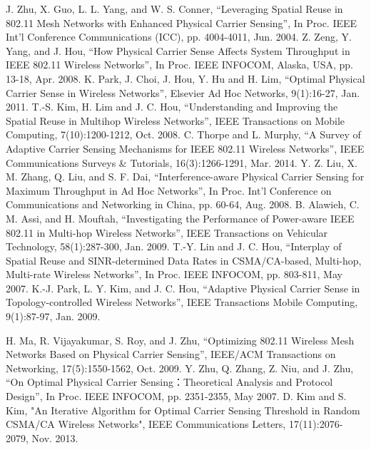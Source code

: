 \documentclass[12pt,a4paper]{article}
\begin{document}
\begin{thebibliography}{00}
 J. Zhu, X. Guo, L. L. Yang, and W. S. Conner, “Leveraging Spatial Reuse in 802.11 Mesh Networks with Enhanced Physical Carrier Sensing”, In Proc. IEEE Int’l Conference Communications (ICC), pp. 4004-4011, Jun. 2004.
 Z. Zeng, Y. Yang, and J. Hou, “How Physical Carrier Sense Affects System Throughput in IEEE 802.11 Wireless Networks”, In Proc. IEEE INFOCOM, Alaska, USA, pp. 13-18, Apr. 2008.
 K. Park, J. Choi, J. Hou, Y. Hu and H. Lim, “Optimal Physical Carrier Sense in Wireless Networks”, Elsevier Ad Hoc Networks, 9(1):16-27, Jan. 2011.
 T.-S. Kim, H. Lim and J. C. Hou, “Understanding and Improving the Spatial Reuse in Multihop Wireless Networks”, IEEE Transactions on Mobile Computing, 7(10):1200-1212, Oct. 2008.
 C. Thorpe and L. Murphy, “A Survey of Adaptive Carrier Sensing Mechanisms for IEEE 802.11 Wireless Networks”, IEEE Communications Surveys \& Tutorials, 16(3):1266-1291, Mar. 2014.
 Y. Z. Liu, X. M. Zhang, Q. Liu, and S. F. Dai, “Interference-aware Physical Carrier Sensing for Maximum Throughput in Ad Hoc Networks”, In Proc. Int’l Conference on Communications and Networking in China, pp. 60-64, Aug. 2008.
 B. Alawieh, C. M. Assi, and H. Mouftah, “Investigating the Performance of Power-aware IEEE 802.11 in Multi-hop Wireless Networks”, IEEE Transactions on Vehicular Technology, 58(1):287-300, Jan. 2009.
 T.-Y. Lin and J. C. Hou, “Interplay of Spatial Reuse and SINR-determined Data Rates in CSMA/CA-based, Multi-hop, Multi-rate Wireless Networks”, In Proc. IEEE INFOCOM, pp. 803-811, May 2007.
 K.-J. Park, L. Y. Kim, and J. C. Hou, “Adaptive Physical Carrier Sense in Topology-controlled Wireless Networks”, IEEE Transactions Mobile Computing, 9(1):87-97, Jan. 2009.


 H. Ma, R. Vijayakumar, S. Roy, and J. Zhu, “Optimizing 802.11 Wireless Mesh Networks Based on Physical Carrier Sensing”, IEEE/ACM Transactions on Networking, 17(5):1550-1562, Oct. 2009.
 Y. Zhu, Q. Zhang, Z. Niu, and J. Zhu, “On Optimal Physical Carrier Sensing：Theoretical Analysis and Protocol Design”, In Proc. IEEE INFOCOM, pp. 2351-2355,  May 2007.
 D. Kim and S. Kim, "An Iterative Algorithm for Optimal Carrier Sensing Threshold in Random CSMA/CA Wireless Networks", IEEE Communications Letters, 17(11):2076-2079, Nov. 2013.

\end{thebibliography}
\label{LastPage}
\end{document}
